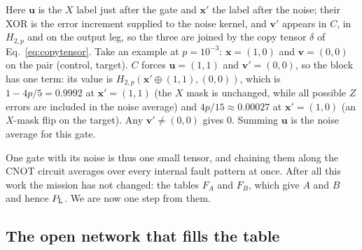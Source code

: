 \begin{center}
\end{center}
Here $\boldsymbol u$ is the $X$ label just after the gate and $\boldsymbol x'$ the label after the noise; their XOR is the error increment supplied to the noise kernel, and $\boldsymbol v'$ appears in $C$, in $H_{2,p}$ and on the output leg, so the three are joined by the copy tensor $\delta$ of Eq.~\eqref{eq:copytensor}. Take an example at $p=10^{-3}$: $\boldsymbol x=(1,0)$ and $\boldsymbol v=(0,0)$ on the pair (control, target). $C$ forces $\boldsymbol u=(1,1)$ and $\boldsymbol v'=(0,0)$, so the block has one term: its value is $H_{2,p}(\boldsymbol x'\oplus(1,1),(0,0))$, which is $1-4p/5=0.9992$ at $\boldsymbol x'=(1,1)$ (the $X$ mask is unchanged, while all possible $Z$ errors are included in the noise average) and $4p/15\approx0.00027$ at $\boldsymbol x'=(1,0)$ (an $X$-mask flip on the target). Any $\boldsymbol v'\ne(0,0)$ gives $0$. Summing $\boldsymbol u$ is the noise average for this gate.

One gate with its noise is thus one small tensor, and chaining them along the CNOT circuit averages over every internal fault pattern at once. After all this work the mission has not changed: the tables $F_A$ and $F_B$, which give $A$ and $B$ and hence $P_{\mathrm L}$. We are now one step from them.

\subsection{The open network that fills the table}\label{app:B-open}

